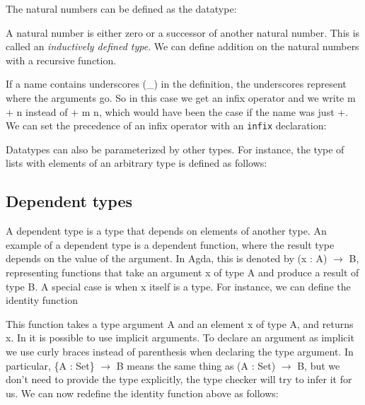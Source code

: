 \documentclass[titlepage]{article}
\begin{document}
The natural numbers can be defined as the datatype:


A natural number is either zero or a successor of another natural number. This is called an \textit{inductively defined type}. We can define addition on the natural numbers with a recursive function.


If a name contains underscores (\_) in the definition, the underscores represent where the arguments go. So in this case we get an infix operator and we write m + n instead of + m n, which would have been the case if the name was just +. We can set the precedence of an infix operator with an \texttt{infix} declaration:


Datatypes can also be parameterized by other types. For instance, the type of lists with elements of an arbitrary type is defined as follows:



\subsection{Dependent types}

A dependent type is a type that depends on elements of another type. An example of a dependent type is a dependent function, where the result type depends on the value of the argument.  In Agda, this is denoted by (x : A) $\to$ B, representing functions that take an argument x of type A and produce a result of type B. A special case is when x itself is a type. For instance, we can define the identity function


This function takes a type argument A and an element x of type A, and returns x. In \Agda it is possible to use implicit arguments. To declare an argument as implicit we use curly braces instead of parenthesis when declaring the type argument. In particular, \{A : Set\} $\to$ B means the same thing as (A : Set) $\to$ B, but we don't need to provide the type explicitly, the type checker will try to infer it for us. We can now redefine the identity function above as follows:

\end{document}
